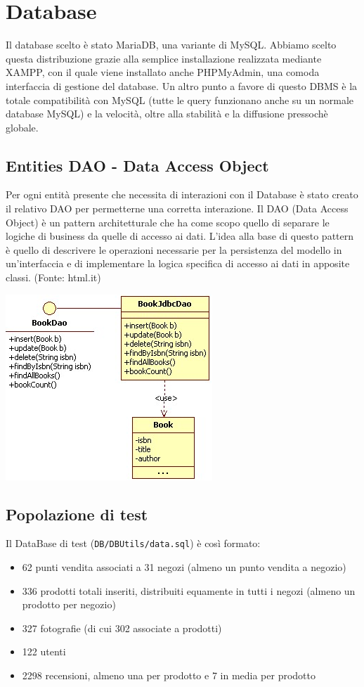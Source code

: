 \chapter{Database}

Il database scelto è stato MariaDB, una variante di MySQL. Abbiamo scelto questa distribuzione grazie alla semplice installazione realizzata mediante XAMPP, con il quale viene installato anche PHPMyAdmin, una comoda interfaccia di gestione del database. Un altro punto a favore di questo DBMS è la totale compatibilità con MySQL (tutte le query funzionano anche su un normale database MySQL) e la velocità, oltre alla stabilità e la diffusione pressochè globale.

\section{Entities DAO - Data Access Object}
Per ogni entità presente che necessita di interazioni con il Database è stato creato il relativo DAO per permetterne una corretta interazione. Il DAO (Data Access Object) è un pattern architetturale che ha come scopo quello di separare le logiche di business da quelle di accesso ai dati. L’idea alla base di questo pattern è quello di descrivere le operazioni necessarie per la persistenza del modello in un’interfaccia e di implementare la logica specifica di accesso ai dati in apposite classi. (Fonte: html.it)

\begin{center}
\includegraphics[width=0.3\linewidth]{img/dao}
\end{center}


\section{Popolazione di test}
Il DataBase di test (\texttt{DB/DBUtils/data.sql}) è così formato:
\begin{itemize}

  \item 62 punti vendita associati a 31 negozi (almeno un punto vendita a negozio)
  \item 336 prodotti totali inseriti, distribuiti equamente in tutti i negozi (almeno un prodotto per negozio)
  \item 327 fotografie (di cui 302 associate a prodotti)
  \item 122 utenti
  \item 2298 recensioni, almeno una per prodotto e 7 in media per prodotto

\end{itemize}

